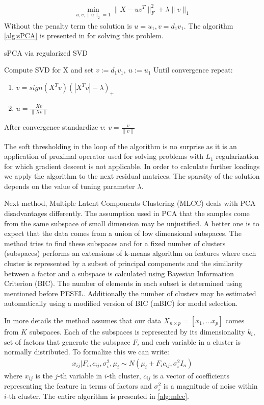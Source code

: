 \documentclass[12pt, wide]{mwart}
\begin{document}
\begin{align*}
    \min_{u,v, \|u\|_2=1}\|X - uv^T\|_F^2 + \lambda \| v \|_1
\end{align*}
Without the penalty term the solution is $u = u_1, v=d_1v_1$. The algorithm \ref{alg:sPCA} is presented in \cite{SPCAnew} for solving this problem.
\begin{algorithm}
\caption{sPCA via regularized SVD}
\label{alg:sPCA}          
\begin{algorithmic}                    
    \STATE Compute SVD for X and set $v := d_1v_1, \ u := u_1$
    \STATE Until convergence repeat:
    \begin{enumerate}
        \item $v = sign(X^Tv)(|X^Tv| - \lambda)_+$
        \item $u = \frac{Xv}{\|Xv\|}$
    \end{enumerate}
    \STATE After convergence standardize $v$: $v = \frac{v}{\|v\|}$
\end{algorithmic}
\end{algorithm}

The soft thresholding in the loop of the algorithm is no surprise as it is an application of proximal operator used for solving problems with $L_1$ regularization for which gradient descent is not applicable. In order to calculate further loadings we apply the algorithm to the next residual matrices. The sparsity of the solution depends on the value of tuning parameter $\lambda$.

Next method, Multiple Latent Components Clustering (MLCC) deals with PCA disadvantages differently. The assumption used in PCA that the samples come from the same subspace of small dimension may be unjustified. A better one is to expect that the data comes from a union of low dimensional subspaces. The method tries to find these subspaces and for a fixed number of clusters (subspaces) performs an extensions of k-means algorithm on features where each cluster is represented by a subset of principal components and the similarity between a factor and a subspace is calculated using Bayesian Information Criterion (BIC). The number of elements in each subset is determined using mentioned before PESEL. Additionally the number of clusters may be estimated automatically using a modified version of BIC (mBIC) for model selection. 

In more details the method assumes that our data $X_{n\times p} = [x_1, \ldots x_p]$ comes from $K$ subspaces. Each of the subspaces is represented by its dimensionality $k_i$, set of factors that generate the subspace $F_i$ and each variable in a cluster is normally distributed. To formalize this we can write:
\begin{align*}
    x_{i j} | F_{i}, c_{i j}, \sigma_{i}^{2}, \mu_{i} \sim N\left(\mu_{i} + F_{i} c_{i j}, \sigma_{i}^{2} I_{n}\right)
\end{align*} 
where $x_{ij}$ is the $j$-th variable in $i$-th cluster, $c_{ij}$ is a vector of coefficients representing the feature in terms of factors and $\sigma_i^2$ is a magnitude of noise within $i$-th cluster. The entire algorithm is presented in \ref{alg:mlcc}.
\end{document}
